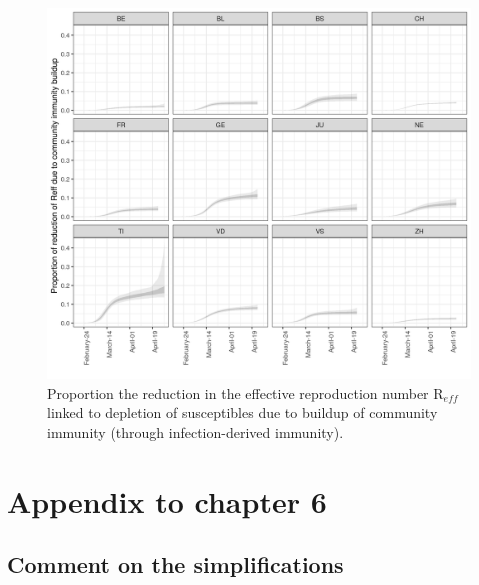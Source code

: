 \begin{figure}[!htb]
    \centering
    \includegraphics[width=.8\textwidth]{fig_covid-switzerland-npi/fig_supp/proportion_Reff_depletion.png}
    \caption[Proportion of R$_{eff}$reduction linked to depletion of susceptibles]{Proportion the reduction in the effective reproduction number R$_{eff}$ linked to depletion of susceptibles due to buildup of community immunity (through infection-derived immunity).}
    \label{fig:roportion_Reff_depletion}
\end{figure}



\chapter{Appendix to chapter 6}

\section{Comment on the simplifications}
